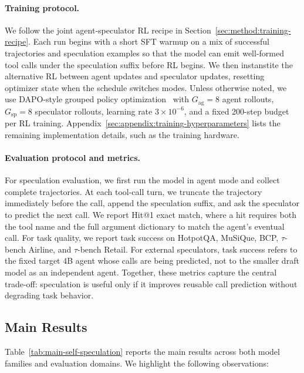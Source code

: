 \paragraph{Training protocol.}
We follow the joint agent-speculator RL recipe in
Section~\ref{sec:method:training-recipe}. Each run begins with a short SFT
warmup on a mix of successful trajectories and speculation examples so that the model can emit well-formed tool
calls under the speculation suffix before RL begins. We then instanstite the alternative RL between
agent updates and speculator updates, resetting optimizer state when the
schedule switches modes. Unless otherwise noted, we use DAPO-style grouped
policy optimization~\citep{yu2025dapo} with $G_{\mathrm{ag}}=8$ agent rollouts,
$G_{\mathrm{sp}}=8$ speculator rollouts, learning rate $3\times10^{-6}$, and a
fixed 200-step budget per RL training. Appendix~\ref{sec:appendix:training-hyperparameters}
lists the remaining implementation details, such as the training hardware.


\paragraph{Evaluation protocol and metrics.}
For speculation evaluation, we first run the model in agent mode and collect
complete trajectories. At each tool-call turn, we truncate the trajectory
immediately before the call, append the speculation suffix, and ask the
speculator to predict the next call. We report Hit@1 exact match, where a hit
requires both the tool name and the full argument dictionary to match the
agent's eventual call. For task quality, we report task success on HotpotQA,
MuSiQue, BCP, $\tau$-bench Airline, and $\tau$-bench Retail. For external
speculators, task success refers to the fixed target 4B agent whose calls are
being predicted, not to the smaller draft model as an independent agent.
Together, these metrics capture the central trade-off: speculation is useful
only if it improves reusable call prediction without degrading task behavior.

\subsection{Main Results}
\label{sec:results}

Table~\ref{tab:main-self-speculation} reports the main results across both model
families and evaluation domains. We highlight the following observations:

